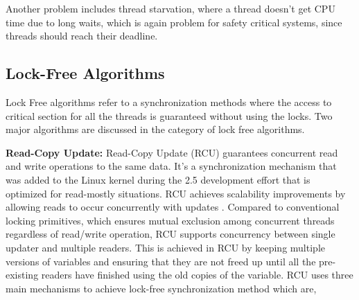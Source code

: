 Another problem includes thread starvation, where a thread doesn't get CPU time due to long waits, which is again problem for safety critical systems, since threads should reach their deadline.
 
\subsection{Lock-Free Algorithms}

Lock Free algorithms refer to a synchronization methods where the access to critical section for all the threads is guaranteed without using the locks. Two major algorithms are discussed in the category of lock free algorithms.

\textbf{Read-Copy Update:}
Read-Copy Update (RCU) guarantees concurrent read and write operations to the same data.  It's a synchronization mechanism that was added to the Linux kernel during the 2.5 development effort that is optimized for read-mostly situations. RCU achieves scalability improvements by allowing reads to occur concurrently with updates \cite{whatisrcu}. Compared to conventional locking primitives, which ensures mutual exclusion among concurrent threads regardless of read/write operation, RCU supports concurrency between single updater and multiple readers. This is achieved in RCU by keeping multiple versions of variables and ensuring that they are not freed up until all the pre-existing readers have finished using the old copies of the variable. RCU uses three main mechanisms to achieve lock-free synchronization method which are,

